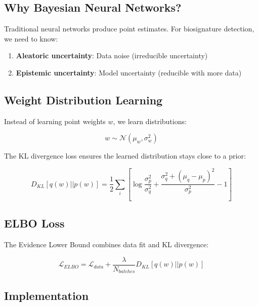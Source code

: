 \documentclass[12pt,a4paper,oneside]{report}
\begin{document}
\subsection{Why Bayesian Neural Networks?}

Traditional neural networks produce point estimates. For biosignature detection, we need to know:
\begin{enumerate}
    \item \textbf{Aleatoric uncertainty}: Data noise (irreducible uncertainty)
    \item \textbf{Epistemic uncertainty}: Model uncertainty (reducible with more data)
\end{enumerate}

\subsection{Weight Distribution Learning}

Instead of learning point weights $w$, we learn distributions:

\begin{equation}
w \sim \mathcal{N}(\mu_w, \sigma_w^2)
\label{eq:weight_dist}
\end{equation}

The KL divergence loss ensures the learned distribution stays close to a prior:

\begin{equation}
D_{KL}[q(w)||p(w)] = \frac{1}{2}\sum_i \left[\log\frac{\sigma_p^2}{\sigma_q^2} + \frac{\sigma_q^2 + (\mu_q - \mu_p)^2}{\sigma_p^2} - 1\right]
\label{eq:kl_divergence}
\end{equation}

\subsection{ELBO Loss}

The Evidence Lower Bound combines data fit and KL divergence:

\begin{equation}
\mathcal{L}_{ELBO} = \mathcal{L}_{data} + \frac{\lambda}{N_{batches}} D_{KL}[q(w)||p(w)]
\label{eq:elbo}
\end{equation}

\subsection{Implementation}
\end{document}
